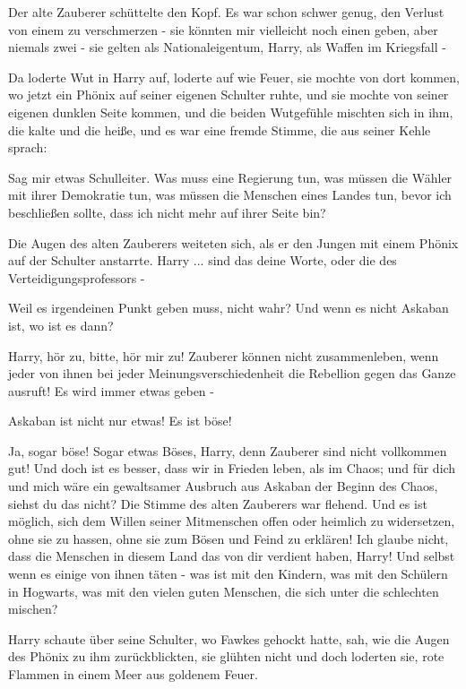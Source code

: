 Der alte Zauberer schüttelte den Kopf. \glqq Es war schon schwer genug, den
Verlust von einem zu verschmerzen - sie könnten mir vielleicht noch einen geben,
aber niemals zwei - sie gelten als Nationaleigentum, Harry, als Waffen im
Kriegsfall -\grqq{}

Da loderte Wut in Harry auf, loderte auf wie Feuer, sie mochte von dort kommen,
wo jetzt ein Phönix auf seiner eigenen Schulter ruhte, und sie mochte von seiner
eigenen dunklen Seite kommen, und die beiden Wutgefühle mischten sich in ihm,
die kalte und die heiße, und es war eine fremde Stimme, die aus seiner Kehle
sprach:

\glqq Sag mir etwas Schulleiter. Was muss eine Regierung tun, was müssen die
Wähler mit ihrer Demokratie tun, was müssen die Menschen eines Landes tun, bevor
ich beschließen sollte, dass ich nicht mehr auf ihrer Seite bin?\grqq{}

Die Augen des alten Zauberers weiteten sich, als er den Jungen mit einem Phönix
auf der Schulter anstarrte. \glqq Harry ... sind das deine Worte, oder die des
Verteidigungsprofessors -\grqq{}

\glqq Weil es irgendeinen Punkt geben muss, nicht wahr? Und wenn es nicht
Askaban ist, wo ist es dann?\grqq{}

\glqq Harry, hör zu, bitte, hör mir zu! Zauberer können nicht zusammenleben,
wenn jeder von ihnen bei jeder Meinungsverschiedenheit die Rebellion gegen das
Ganze ausruft! Es wird immer etwas geben -\grqq{}

\glqq Askaban ist nicht nur etwas! Es ist böse!\grqq{}

\glqq Ja, sogar böse! Sogar etwas Böses, Harry, denn Zauberer sind nicht
vollkommen gut! Und doch ist es besser, dass wir in Frieden leben, als im Chaos;
und für dich und mich wäre ein gewaltsamer Ausbruch aus Askaban der Beginn des
Chaos, siehst du das nicht?\grqq{} Die Stimme des alten Zauberers war flehend.
\glqq Und es ist möglich, sich dem Willen seiner Mitmenschen offen oder heimlich
zu widersetzen, ohne sie zu hassen, ohne sie zum Bösen und Feind zu erklären!
Ich glaube nicht, dass die Menschen in diesem Land das von dir verdient haben,
Harry! Und selbst wenn es einige von ihnen täten - was ist mit den Kindern, was
mit den Schülern in Hogwarts, was mit den vielen guten Menschen, die sich unter
die schlechten mischen?\grqq{}

Harry schaute über seine Schulter, wo Fawkes gehockt hatte, sah, wie die Augen
des Phönix zu ihm zurückblickten, sie glühten nicht und doch loderten sie, rote
Flammen in einem Meer aus goldenem Feuer.

